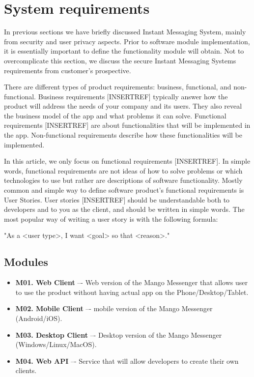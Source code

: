 \chapter{System requirements}\label{ch:system-requirements}

In previous sections we have briefly discussed Instant Messaging System, mainly from security and user privacy aspects.
Prior to software module implementation, it is essentially important to define the functionality module will obtain.
Not to overcomplicate this section, we discuss the secure Instant Messaging Systems requirements from customer's prospective.

There are different types of product requirements: business, functional, and non-functional.
Business requirements [INSERTREF] typically answer how the product will address the needs of your company and its users.
They also reveal the business model of the app and what problems it can solve.
Functional requirements [INSERTREF] are about functionalities that will be implemented in the app.
Non-functional requirements describe how these functionalities will be implemented.

In this article, we only focus on functional requirements [INSERTREF].
In simple words, functional requirements are not ideas of how to solve problems or which technologies to use but rather
are descriptions of software functionality.
Mostly common and simple way to define software product's functional requirements is User Stories.
User stories [INSERTREF] should be understandable both to developers and to you as the client, and should be written in simple words.
The most popular way of writing a user story is with the following formula:

\begin{center}
    "As a <user type>, I want <goal> so that <reason>."
\end{center}


\section{Modules}\label{sec:modules}
\begin{itemize}
    \item \textbf{M01. Web Client} –- Web version of the Mango Messenger that allows user to use the
    product without having actual app on the Phone/Desktop/Tablet.
    \item \textbf{M02. Mobile Client} –- mobile version of the Mango Messenger (Android/iOS).
    \item \textbf{M03. Desktop Client} –- Desktop version of the Mango Messenger (Windows/Linux/MacOS).
    \item \textbf{M04. Web API} –- Service that will allow developers to create their own clients.
\end{itemize}

